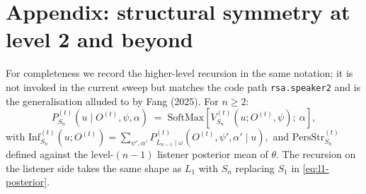 \documentclass[11pt]{article}
\newcommand{\Obs}{O}                 %
\newcommand{\Utt}{u}                 %
\newcommand{\Inf}{\mathrm{Inf}}
\newcommand{\Pers}{\mathrm{PersStr}}
\newcommand{\SOne}{S_1}
\newcommand{\LOne}{L_1}
\newcommand{\Pspk}[2]{P^{(#2)}_{#1}}
\begin{document}
\section*{Appendix: structural symmetry at level 2 and beyond}

For completeness we record the higher-level recursion in the same
notation; it is not invoked in the current sweep but matches the code
path \texttt{rsa.speaker2} and is the generalisation alluded to by Fang
(2025). For $n \ge 2$:
\[
    \Pspk{S_n}{t}(\Utt \mid \Obs^{(t)}, \psi, \alpha)
    \;=\; \mathrm{SoftMax}\!\left[V^{(t)}_{S_n}(\Utt; \Obs^{(t)}, \psi);\ \alpha\right],
\]
with
\(
    \Inf^{(t)}_{S_n}(\Utt; \Obs^{(t)})
    = \sum_{\psi', \alpha'} \Pspk{L_{n-1} \mid \omega}{t}(\Obs^{(t)}, \psi', \alpha' \mid \Utt),
\)
and $\Pers^{(t)}_{S_n}$ defined against the level-$(n{-}1)$ listener
posterior mean of $\theta$. The recursion on the listener side takes the
same shape as $\LOne$ with $S_n$ replacing $\SOne$ in
\eqref{eq:l1-posterior}.
\end{document}
